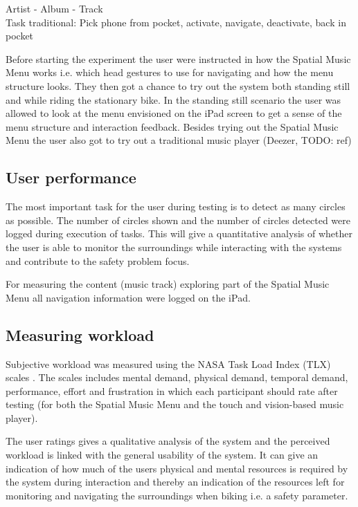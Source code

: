 Artist - Album - Track\\
Task traditional: Pick phone from pocket, activate, navigate, deactivate, back in pocket

Before starting the experiment the user were instructed in how the Spatial Music Menu works i.e. which head gestures to use for navigating and how the menu structure looks. They then got a chance to try out the system both standing still and while riding the stationary bike. In the standing still scenario the user was allowed to look at the menu envisioned on the iPad screen to get a sense of the menu structure and interaction feedback. Besides trying out the Spatial Music Menu the user also got to try out a traditional music player (Deezer, TODO: ref)

\subsection{User performance}
The most important task for the user during testing is to detect as many circles as possible. The number of circles shown and the number of circles detected were logged during execution of tasks. This will give a quantitative analysis of whether the user is able to monitor the surroundings while interacting with the systems and contribute to the safety problem focus.

For measuring the content (music track) exploring part of the Spatial Music Menu all navigation information were logged on the iPad. 



\subsection{Measuring workload}
Subjective workload was measured using the NASA Task Load Index (TLX) scales \cite{hart_workload_1990}. The scales includes mental demand, physical demand, temporal demand, performance, effort and frustration in which each participant should rate after testing (for both the Spatial Music Menu and the touch and vision-based music player). 

The user ratings gives a qualitative analysis of the system and the perceived workload is linked with the general usability of the system. It can give an indication of how much of the users physical and mental resources is required by the system during interaction and thereby an indication of the resources left for monitoring and navigating the surroundings when biking i.e. a safety parameter.


